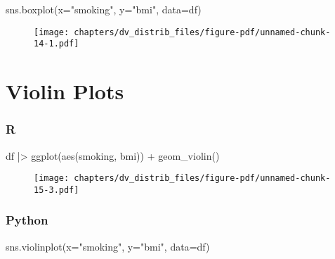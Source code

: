 \documentclass[
  letterpaper,
  DIV=11,
  numbers=noendperiod]{scrreprt}
\newenvironment{Shaded}{\begin{snugshade}}{\end{snugshade}}
\newcommand{\FunctionTok}[1]{\textcolor[rgb]{0.28,0.35,0.67}{#1}}
\newcommand{\NormalTok}[1]{\textcolor[rgb]{0.00,0.46,0.62}{#1}}
\newcommand{\OperatorTok}[1]{\textcolor[rgb]{0.37,0.37,0.37}{#1}}
\newcommand{\SpecialCharTok}[1]{\textcolor[rgb]{0.37,0.37,0.37}{#1}}
\newcommand{\StringTok}[1]{\textcolor[rgb]{0.13,0.47,0.30}{#1}}
\begin{document}
\begin{Shaded}
\begin{Highlighting}[]
\NormalTok{sns.boxplot(x}\OperatorTok{=}\StringTok{"smoking"}\NormalTok{, y}\OperatorTok{=}\StringTok{"bmi"}\NormalTok{, data}\OperatorTok{=}\NormalTok{df)}
\end{Highlighting}
\end{Shaded}

\begin{figure}[H]

{\centering \texttt{[image: chapters/dv\_distrib\_files/figure-pdf/unnamed-chunk-14-1.pdf]}

}

\end{figure}

\hypertarget{violin-plots}{%
\section{Violin Plots}\label{violin-plots}}

\hypertarget{r-49}{%
\subsubsection{R}\label{r-49}}

\begin{Shaded}
\begin{Highlighting}[]
\NormalTok{df }\SpecialCharTok{|\textgreater{}} 
    \FunctionTok{ggplot}\NormalTok{(}\FunctionTok{aes}\NormalTok{(smoking, bmi)) }\SpecialCharTok{+}
    \FunctionTok{geom\_violin}\NormalTok{()}
\end{Highlighting}
\end{Shaded}

\begin{figure}[H]

{\centering \texttt{[image: chapters/dv\_distrib\_files/figure-pdf/unnamed-chunk-15-3.pdf]}

}

\end{figure}

\hypertarget{python-49}{%
\subsubsection{Python}\label{python-49}}

\begin{Shaded}
\begin{Highlighting}[]
\NormalTok{sns.violinplot(x}\OperatorTok{=}\StringTok{"smoking"}\NormalTok{, y}\OperatorTok{=}\StringTok{"bmi"}\NormalTok{, data}\OperatorTok{=}\NormalTok{df)}
\end{Highlighting}
\end{Shaded}
\end{document}
